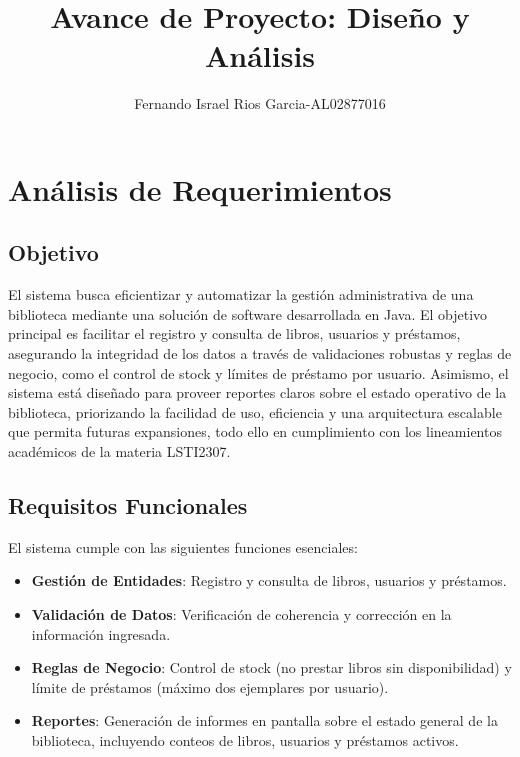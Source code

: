 \documentclass[stu, 12pt, letterpaper, donotrepeattitle]{apa7}
\title{Avance de Proyecto: Diseño y Análisis}
\author{Fernando Israel Rios Garcia-AL02877016}
\affiliation{Universidad Tecmilenio-Campus Corregidora}
\begin{document}
    \maketitle


    \section{Análisis de Requerimientos}
    
    \subsection{Objetivo}
    El sistema busca eficientizar y automatizar la gestión administrativa de una biblioteca mediante una solución de software desarrollada en Java. El objetivo principal es facilitar el registro y consulta de libros, usuarios y préstamos, asegurando la integridad de los datos a través de validaciones robustas y reglas de negocio, como el control de stock y límites de préstamo por usuario. Asimismo, el sistema está diseñado para proveer reportes claros sobre el estado operativo de la biblioteca, priorizando la facilidad de uso, eficiencia y una arquitectura escalable que permita futuras expansiones, todo ello en cumplimiento con los lineamientos académicos de la materia LSTI2307.

    \subsection{Requisitos Funcionales}
    El sistema cumple con las siguientes funciones esenciales:
    \begin{itemize}
        \item \textbf{Gestión de Entidades}: Registro y consulta de libros, usuarios y préstamos.
        \item \textbf{Validación de Datos}: Verificación de coherencia y corrección en la información ingresada.
        \item \textbf{Reglas de Negocio}: Control de stock (no prestar libros sin disponibilidad) y límite de préstamos (máximo dos ejemplares por usuario).
        \item \textbf{Reportes}: Generación de informes en pantalla sobre el estado general de la biblioteca, incluyendo conteos de libros, usuarios y préstamos activos.
    \end{itemize}
\end{document}
